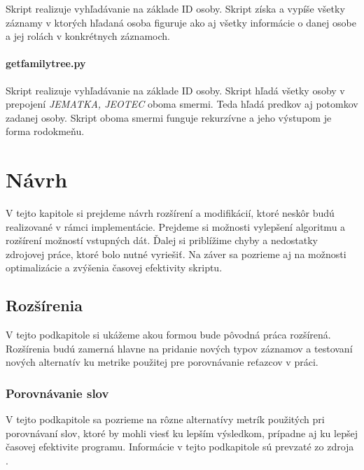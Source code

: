 Skript realizuje vyhľadávanie na základe ID osoby. Skript získa a vypíše všetky záznamy
v ktorých hľadaná osoba figuruje ako aj všetky informácie o danej osobe a jej rolách
v konkrétnych záznamoch.

\subsubsection{get\textunderscore family\textunderscore tree.py}
Skript realizuje vyhľadávanie na základe ID osoby. Skript hľadá všetky osoby v prepojení \textit{JE\textunderscore MATKA, JE\textunderscore OTEC} oboma smermi. Teda hľadá predkov aj potomkov
zadanej osoby. Skript oboma smermi funguje rekurzívne a jeho výstupom je forma
rodokmeňu.

\chapter{Návrh}
V tejto kapitole si prejdeme návrh rozšírení a modifikácií, ktoré neskôr budú realizované
v rámci implementácie. Prejdeme si možnosti vylepšení algoritmu a rozšírení možností
vstupných dát. Ďalej si priblížime chyby a nedostatky zdrojovej práce, ktoré bolo nutné vyriešiť. Na záver sa pozrieme aj na možnosti optimalizácie a zvýšenia časovej efektivity skriptu.

\section{Rozšírenia}
V tejto podkapitole si ukážeme akou formou bude pôvodná práca rozšírená. Rozšírenia budú zamerná hlavne na pridanie nových typov záznamov a testovaní nových alternatív ku metrike použitej pre porovnávanie reťazcov v práci.

\subsection{Porovnávanie slov}
V tejto podkapitole sa pozrieme na rôzne alternatívy metrík použitých pri porovnávaní slov, ktoré by
mohli viesť ku lepším výsledkom, prípadne aj ku lepšej časovej efektivite programu.
Informácie v tejto podkapitole sú prevzaté zo zdroja \cite{strings}.
\newpage
